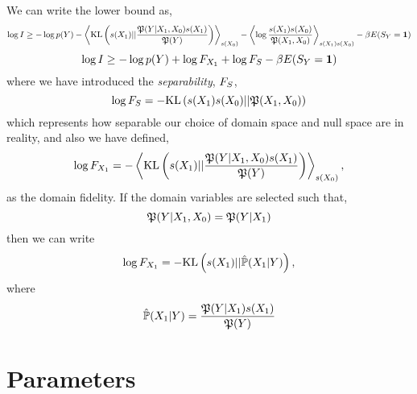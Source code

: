 \documentclass[]{article}
\begin{document}
We can write the lower bound as,
$$
\log I \geq -\log p(Y) - \left\langle \text{KL}\left(s({X_1}) || \frac{\mathfrak{P}(Y | {X_1},{X_0})s({X_1})}{\mathfrak{P}(Y)}\right) \right\rangle_{s({X_0})}  - \left\langle \log \frac{s({X_1})s({X_0})}{\mathfrak{P}({X_1},{X_0})} \right\rangle_{s({X_1})s({X_0})}  -\beta E(S_Y=\textbf{1})
$$
$$
\log I \geq -\log p(Y) + \log F_{X_1}  + \log {F_S}  -\beta E(S_Y=\textbf{1})
$$
where we have introduced the \emph{separability}, ${F_S}$,
$$
\log {F_S} = - \text{KL}\left(s({X_1})s({X_0})||\mathfrak{P}({X_1},{X_0})\right)
$$
which represents how separable our choice of domain space and null space are in reality,
and also we have defined,
$$
\log F_{X_1} = - \left\langle \text{KL}\left(s({X_1}) || \frac{\mathfrak{P}(Y | {X_1},{X_0})s({X_1})}{\mathfrak{P}(Y)}\right) \right\rangle_{s({X_0})},
$$
as the domain fidelity. If the domain variables are selected such that,
$$
\mathfrak{P}(Y | {X_1}, {X_0}) = \mathfrak{P}(Y |{X_1})
$$
then we can write
$$
\log F_{X_1} = - \text{KL}\left(s({X_1}) || \hat{\mathbb{P}}({X_1} | Y) \right),
$$
where
$$
\hat{\mathbb{P}}({X_1} | Y) = \frac{\mathfrak{P}(Y | {X_1})s({X_1})}{\mathfrak{P}(Y)}
$$

\section{Parameters}
\end{document}
